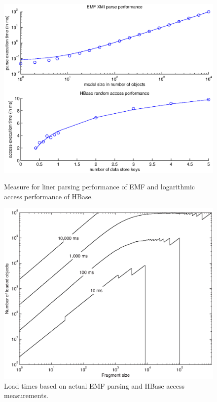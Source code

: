 \begin{figure}[ht]
\begin{minipage}[b]{0.5\linewidth}
\centering
\includegraphics[width=\linewidth]{figures/emfHbasePerf}
\caption{Measure for liner parsing performance of EMF and logarithmic access performance of HBase.}
\label{fig:figures/emf_hbase_performance_measured}
\end{minipage}
\hspace{0.5cm}
\begin{minipage}[b]{0.5\linewidth}
\centering
\includegraphics[width=\linewidth]{figures/fragTheoryContour}
\caption{Load times based on actual EMF parsing and HBase access measurements.}
\label{fig:optimal_load_times_measured}
\end{minipage}
\end{figure}

